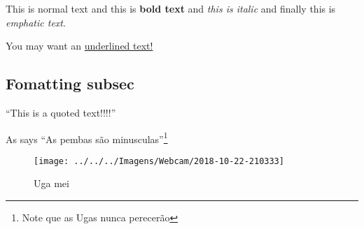 \documentclass{article}
\begin{document}
This is normal text and this is \textbf{bold text} and \textit{this is italic} and finally this is \emph{emphatic text}.  

You may want an \underline{underlined text!}


\subsection{Fomatting subsec}

``This is a quoted text!!!!''

As \textcite{uga} says ``As pembas são minusculas''\footnote{Note que as Ugas nunca perecerão}
\begin{figure}
	\texttt{[image: ../../../Imagens/Webcam/2018-10-22-210333]}
	\caption{Uga mei}
	\label{fig:2018-10-22-210333}
\end{figure}



\printbibliography
\end{document}
